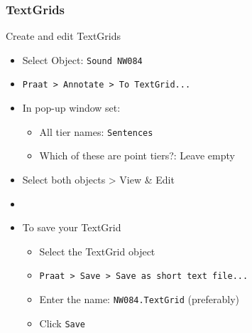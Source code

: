 \documentclass{beamer}
\begin{document}
\begin{frame} 
\frametitle{TextGrids} 
\begin{block}{Create and edit TextGrids}
\begin{itemize} 
\item Select Object: \texttt{Sound NW084}
\item \texttt{Praat > Annotate > To TextGrid...} 
\item In pop-up window set:
\begin{itemize} 
\item All tier names: \texttt{Sentences}
\item Which of these are point tiers?: Leave empty
\end{itemize}
\item Select both objects > View \& Edit
\item [ ]
\item To save your TextGrid
\begin{itemize} 
\item Select the TextGrid object
\item \texttt{Praat > Save > Save as short text file...}
\item Enter the name: \texttt{NW084.TextGrid} (preferably)
\item Click \texttt{Save}
\end{itemize}
\end{itemize}
\end{block} 
\end{frame}
\end{document}
